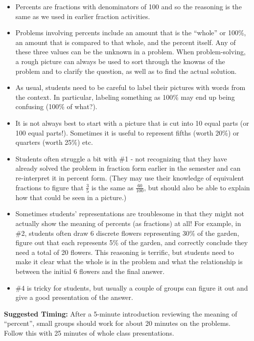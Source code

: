 \documentclass{ximera}
\begin{document}
\begin{instructorNotes}
\begin{itemize}
	\item Percents are fractions with denominators of 100 and so the reasoning is the same as we used in earlier fraction activities.
	\item Problems involving percents include an amount that is the ``whole'' or 100\%, an amount that is compared to that whole, and the percent itself.  Any of these three values can be the unknown in a problem.  When problem-solving, a rough picture can always be used to sort through the knowns of the problem and to clarify the question, as well as to find the actual solution.
	\item  As usual, students need to be careful to label their pictures with words from the context.  In particular, labeling something as 100\% may end up being confusing (100\% of what?).
	\item It is not always best to start with a picture that is cut into 10 equal parts (or 100 equal parts!).   Sometimes it is useful to represent fifths (worth 20\%) or quarters (worth 25\%) etc.
	\item Students often struggle a bit with \#1 - not recognizing that they have already solved the problem in fraction form earlier in the semester and can re-interpret it in percent form.  (They may use their knowledge of equivalent fractions to figure that $\frac35$ is the same as $\frac{60}{100}$, but should also be able to explain how that could be seen in a picture.)  
	\item Sometimes students' representations are troublesome in that they might not actually show the meaning of percents (as fractions) at all!  For example, in \#2, students often draw 6 discrete flowers representing 30\% of the garden, figure out that each represents 5\% of the garden, and correctly conclude they need a total of 20 flowers.  This reasoning is terrific, but students need to make it clear what the whole is in the problem and what the relationship is between the initial 6 flowers and the final answer. 
	\item \#4 is tricky for students, but usually a couple of groups can figure it out and give a good presentation of the answer.
\end{itemize}



{\bf Suggested Timing:} After a 5-minute introduction reviewing the meaning of ``percent'', small groups should work for about 20 minutes on the problems.  Follow this with 25 minutes of whole class presentations.  
\end{instructorNotes}
\end{document}
